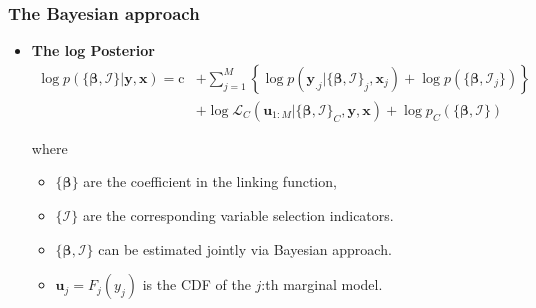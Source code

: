 \documentclass[10pt,aspectratio=43]{beamer}
\begin{document}
\begin{frame}%
  \frametitle{The Bayesian approach}
  \begin{itemize}

  \item \textbf{The log Posterior}
    \[
    \begin{split}\log p(\{\bm{\beta},\bm{\mathcal{I}}\}|\bm{y},\bm{x})=
      \mathrm{c}&+\sum\nolimits _{j=1}^{M}\left\{\log
        p(\bm{y}_{.j}|\{\bm{\beta},\bm{\mathcal{I}}\}_{j},\bm{x}_{j}) + \log p(\{\bm{\beta},\bm{\mathcal{I}}_j\}) \right\}\\
      & +\log\mathcal{L}_{C}(\bm{u}_{1:M}|\{\bm{\beta},\bm{\mathcal{I}}\}_{C},\bm{y},\bm{x})+
      \log p_C(\{\bm{\beta},\bm{\mathcal{I}}\})
    \end{split}
    \]

    where
    \begin{itemize}
    \item $\{\bm{\beta}\}$ are the coefficient in the linking function,
    \item $\{\bm{\mathcal{I}}\}$ are the corresponding variable selection indicators.
    \item $\{\bm{\beta},\bm{\mathcal{I}}\}$ can be estimated jointly via Bayesian approach.
    \item $\bm{u}_{j}=F_{j}(y_{j})$ is the CDF of the $j$:th marginal model.
    \end{itemize}


  \end{itemize}
\end{frame}
\end{document}

